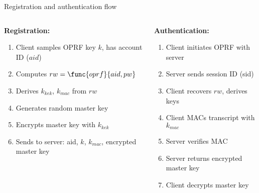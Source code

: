 \documentclass[aspectratio=169, lualatex, handout]{beamer}
\begin{document}
\begin{frame}{Registration and authentication flow}
	\begin{columns}[c]
		\begin{column}{0.5\textwidth}
			\textbf{Registration:}
			\begin{enumerate}
				\item Client samples OPRF key $k$, has account ID ($aid$)
				\item Computes $rw = \func{oprf}{aid, pw}$
				\item Derives $k_{kek}$, $k_{mac}$ from $rw$
				\item Generates random master key
				\item Encrypts master key with $k_{kek}$
				\item Sends to server: aid, $k$, $k_{mac}$, encrypted master key
			\end{enumerate}
		\end{column}
		\begin{column}{0.5\textwidth}
			\textbf{Authentication:}
			\begin{enumerate}
				\item Client initiates OPRF with server
				\item Server sends session ID (sid)
				\item Client recovers $rw$, derives keys
				\item Client MACs transcript with $k_{mac}$
				\item Server verifies MAC
				\item Server returns encrypted master key
				\item Client decrypts master key
			\end{enumerate}
		\end{column}
	\end{columns}
\end{frame}
\end{document}
